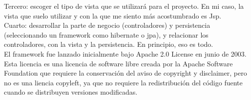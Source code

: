 \begin{itemize}
		Tercero: escoger el tipo de vista que se utilizará para el proyecto. En mi caso, la vista que suelo utilizar y con la que me siento más acostumbrado es Jsp.\\
		
		Cuarto: desarrollar la parte de negocio (controladores) y persistencia (seleccionando un framework como hibernate o jpa), y relacionar los controladores, con la vista y la persistencia.
		En principio, eso es todo.\\
		El framework fue lanzado inicialmente bajo Apache 2.0 License en junio de 2003. Esta licencia es una licencia de software libre creada por la Apache Software Foundation que requiere la conservación del aviso de copyright y disclaimer, pero no es una liencia copyleft, ya que no requiere la redistribución del código fuente cuando se distribuyen versiones modificadas. \cite{introspring} \\
	\end{itemize}

